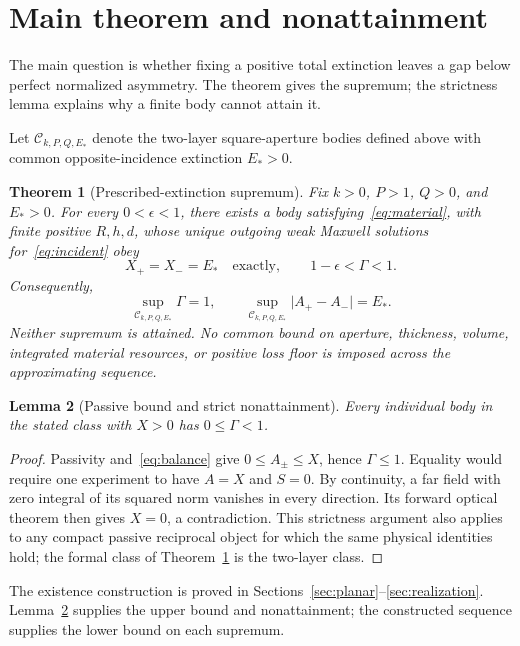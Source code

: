 \documentclass[11pt]{article}
\newtheorem{theorem}{Theorem}[section]
\newtheorem{lemma}[theorem]{Lemma}
\newcommand{\abs}[1]{\lvert #1\rvert}
\begin{document}
\section{Main theorem and nonattainment}\label{sec:main}
The main question is whether fixing a positive total extinction leaves a gap below perfect normalized asymmetry. The theorem gives the supremum; the strictness lemma explains why a finite body cannot attain it.

Let $\mathcal C_{k,P,Q,E_*}$ denote the two-layer square-aperture bodies defined above with common opposite-incidence extinction $E_*>0$.
\begin{theorem}[Prescribed-extinction supremum]\label{thm:main}
Fix $k>0$, $P>1$, $Q>0$, and $E_*>0$. For every $0<\epsilon<1$, there exists a body satisfying~\eqref{eq:material}, with finite positive $R,h,d$, whose unique outgoing weak Maxwell solutions for~\eqref{eq:incident} obey
\begin{equation}\label{eq:main}
 X_+=X_-=E_*\quad\text{exactly},\qquad 1-\epsilon<\Gamma<1.
\end{equation}
Consequently,
\begin{equation}\label{eq:suprema}
 \sup_{\mathcal C_{k,P,Q,E_*}}\Gamma=1,\qquad
 \sup_{\mathcal C_{k,P,Q,E_*}}\abs{A_+-A_-}=E_*.
\end{equation}
Neither supremum is attained. No common bound on aperture, thickness, volume, integrated material resources, or positive loss floor is imposed across the approximating sequence.
\end{theorem}

\begin{lemma}[Passive bound and strict nonattainment]\label{lem:strict}
Every individual body in the stated class with $X>0$ has $0\leq\Gamma<1$.
\end{lemma}
\begin{proof}
Passivity and~\eqref{eq:balance} give $0\leq A_\pm\leq X$, hence $\Gamma\leq1$. Equality would require one experiment to have $A=X$ and $S=0$. By continuity, a far field with zero integral of its squared norm vanishes in every direction. Its forward optical theorem then gives $X=0$, a contradiction. This strictness argument also applies to any compact passive reciprocal object for which the same physical identities hold; the formal class of Theorem~\ref{thm:main} is the two-layer class.
\end{proof}
The existence construction is proved in Sections~\ref{sec:planar}--\ref{sec:realization}. Lemma~\ref{lem:strict} supplies the upper bound and nonattainment; the constructed sequence supplies the lower bound on each supremum.
\end{document}
